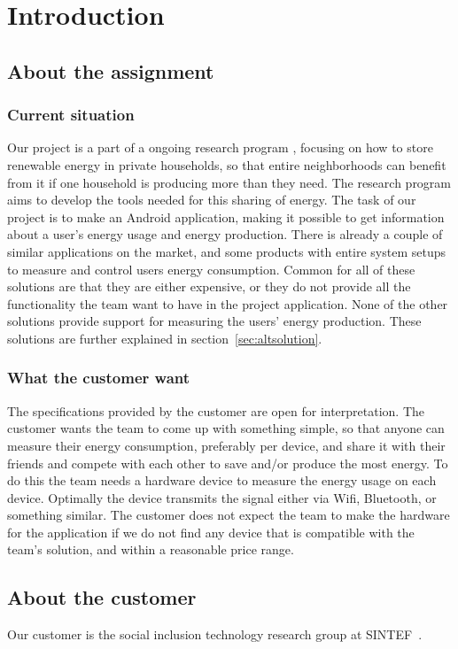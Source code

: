 \chapter{Introduction}

\section{About the assignment}
\subsection{Current situation}
Our project is a part of a ongoing research program \cite{cossmic}, focusing on how to store renewable energy in private households, so that entire neighborhoods can benefit from it if one household is producing more than they need. The research program aims to develop the tools needed for this sharing of energy. The task of our project is to make an Android application, making it possible to get information about a user's energy usage and energy production. There is already a couple of similar applications on the market, and some products with entire system setups to measure and control users energy consumption. Common for all of these solutions are that they are either expensive, or they do not provide all the functionality the team want to have in the project application. None of the other solutions provide support for measuring the users' energy production. These solutions are further explained in section~\ref{sec:altsolution}.

\subsection{What the customer want}
The specifications provided by the customer are open for interpretation. The customer wants the team to come up with something simple, so that anyone can measure their energy consumption, preferably per device, and share it with their friends and compete with each other to save and/or produce the most energy. To do this the team needs a hardware device to measure the energy usage on each device. Optimally the device transmits the signal either via Wifi, Bluetooth, or something similar. The customer does not expect the team to make the hardware for the application if we do not find any device that is compatible with the team's solution, and within a reasonable price range.

\section{About the customer}

Our customer is the social inclusion technology research group at SINTEF~\cite{sintef}.








 


